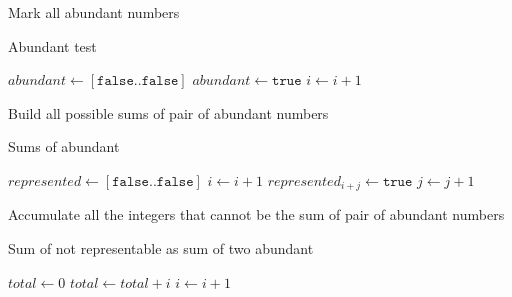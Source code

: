\documentclass{article}
\begin{document}
\newpage
Mark all abundant numbers 

\begin{algorithm}
    \caption{Abundant test}\label{alg:abundant}
    \begin{algorithmic}[1]
        \State $abundant \gets [\texttt{false}..\texttt{false}]$
                \State $abundant \gets \texttt{true}$
            \EndIf
            \State $i \gets i + 1$
        \EndFor
    \end{algorithmic}
\end{algorithm}

Build all possible sums of pair of abundant numbers

\begin{algorithm}
    \caption{Sums of abundant}
    \begin{algorithmic}[1]
        \State $represented \gets [\texttt{false} .. \texttt{false}]$
            \State $i \gets i + 1$
                        \State $represented_{i + j} \gets \texttt{true}$
                    \EndIf
                    \State $j \gets j + 1$
                \EndFor
            \EndIf
        \EndFor
    \end{algorithmic}
\end{algorithm}

Accumulate all the integers that cannot be the sum of pair of abundant numbers

\begin{algorithm}
    \caption{Sum of not representable as sum of two abundant}
    \begin{algorithmic}[1]
        \State $total \gets 0$
                \State $total \gets total + i$
            \EndIf
            \State $i \gets i + 1$
        \EndFor
    \end{algorithmic}
\end{algorithm}
\end{document}
